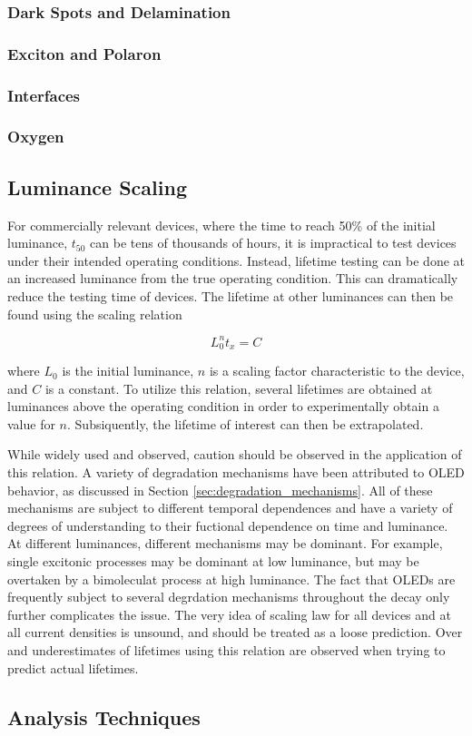 \documentclass[../thesis.tex]{subfiles}
\begin{document}
\subsubsection{Dark Spots and Delamination}



\subsubsection{Exciton and Polaron}
\subsubsection{Interfaces}
\subsubsection{Oxygen}


\subsection{Luminance Scaling}\label{sec:luminance_scaling}
For commercially relevant devices, where the time to reach 50\% of the initial luminance, $t_{50}$ can be tens of thousands of hours, it is impractical to test devices under their intended operating conditions.
Instead, lifetime testing can be done at an increased luminance from the true operating condition.\supercite{Scholz2015}
This can dramatically reduce the testing time of devices.
The lifetime at other luminances can then be found using the scaling relation

\begin{equation}
L_0^n t_x=C
\label{eqn:luminance_scaling}
\end{equation}

where $L_0$ is the initial luminance, $n$ is a scaling factor characteristic to the device, and $C$ is a constant.
To utilize this relation, several lifetimes are obtained at luminances above the operating condition in order to experimentally obtain a value for $n$.
Subsiquently, the lifetime of interest can then be extrapolated.

While widely used and observed, caution should be observed in the application of this relation.  
A variety of degradation mechanisms have been attributed to OLED behavior, as discussed in Section \ref{sec:degradation_mechanisms}.
All of these mechanisms are subject to different temporal dependences and have a variety of degrees of understanding to their fuctional dependence on time and luminance.
At different luminances, different mechanisms may be dominant.
For example, single excitonic processes may be dominant at low luminance, but may be overtaken by a bimoleculat process at high luminance.
The fact that OLEDs are frequently subject to several degrdation mechanisms throughout the decay only further complicates the issue.
The very idea of scaling law for all devices and at all current densities is unsound, and should be treated as a loose prediction.
Over and underestimates of lifetimes using this relation are observed when trying to predict actual lifetimes.\supercite{Meerheim2006,Fry2005}


\subsection{Analysis Techniques}\label{sec:degradation_analysis}




\end{document}
